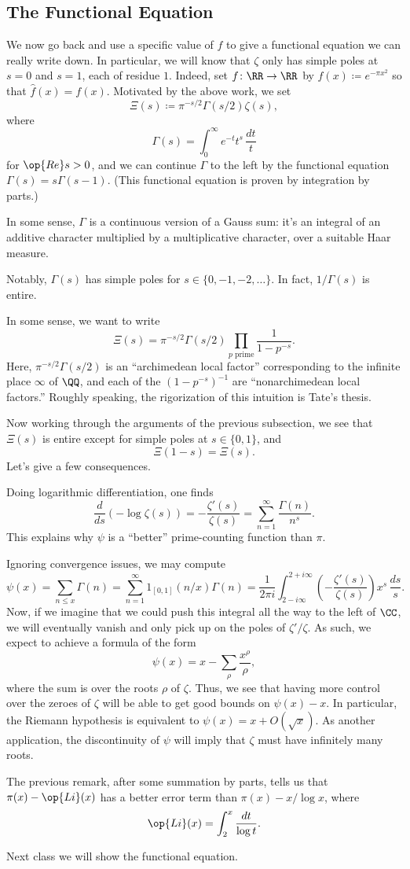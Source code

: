 \documentclass[../notes.tex]{subfiles}
\begin{document}
\subsection{The Functional Equation}
We now go back and use a specific value of $f$ to give a functional equation we can really write down. In particular, we will know that $\zeta$ only has simple poles at $s=0$ and $s=1$, each of residue $1$. Indeed, set $f\colon\RR\to\RR$ by $f(x)\coloneqq e^{-\pi x^2}$ so that $\widehat f(x)=f(x)$. Motivated by the above work, we set
\[\Xi(s)\coloneqq\pi^{-s/2}\Gamma(s/2)\zeta(s),\]
where
\[\Gamma(s)=\int_0^\infty e^{-t}t^s\,\frac{dt}t\]
for $\op{Re}s>0$, and we can continue $\Gamma$ to the left by the functional equation $\Gamma(s)=s\Gamma(s-1)$. (This functional equation is proven by integration by parts.)
\begin{remark}
	In some sense, $\Gamma$ is a continuous version of a Gauss sum: it's an integral of an additive character multiplied by a multiplicative character, over a suitable Haar measure.
\end{remark}
\begin{remark}
	Notably, $\Gamma(s)$ has simple poles for $s\in\{0,-1,-2,\ldots\}$. In fact, $1/\Gamma(s)$ is entire.
\end{remark}
\begin{remark}
	In some sense, we want to write
	\[\Xi(s)=\pi^{-s/2}\Gamma(s/2)\prod_{p\text{ prime}}\frac1{1-p^{-s}}.\]
	Here, $\pi^{-s/2}\Gamma(s/2)$ is an ``archimedean local factor'' corresponding to the infinite place $\infty$ of $\QQ$, and each of the $\left(1-p^{-s}\right)^{-1}$ are ``nonarchimedean local factors.'' Roughly speaking, the rigorization of this intuition is Tate's thesis.
\end{remark}
Now working through the arguments of the previous subsection, we see that $\Xi(s)$ is entire except for simple poles at $s\in\{0,1\}$, and
\[\Xi(1-s)=\Xi(s).\]
Let's give a few consequences.
\begin{remark}
	Doing logarithmic differentiation, one finds
	\[\frac d{ds}(-\log\zeta(s))=-\frac{\zeta'(s)}{\zeta(s)}=\sum_{n=1}^\infty\frac{\Gamma(n)}{n^s}.\]
	This explains why $\psi$ is a ``better'' prime-counting function than $\pi$.
\end{remark}
\begin{remark}
	Ignoring convergence issues, we may compute
	\[\psi(x)=\sum_{n\le x}\Gamma(n)=\sum_{n=1}^\infty1_{[0,1]}(n/x)\Gamma(n)=\frac1{2\pi i}\int_{2-i\infty}^{2+i\infty}\left(-\frac{\zeta'(s)}{\zeta(s)}\right)x^s\,\frac{ds}s.\]
	Now, if we imagine that we could push this integral all the way to the left of $\CC$, we will eventually vanish and only pick up on the poles of $\zeta'/\zeta$. As such, we expect to achieve a formula of the form
	\[\psi(x)=x-\sum_\rho\frac{x^\rho}\rho,\]
	where the sum is over the roots $\rho$ of $\zeta$. Thus, we see that having more control over the zeroes of $\zeta$ will be able to get good bounds on $\psi(x)-x$. In particular, the Riemann hypothesis is equivalent to $\psi(x)=x+O(\sqrt x)$. As another application, the discontinuity of $\psi$ will imply that $\zeta$ must have infinitely many roots.
\end{remark}
\begin{remark}
	The previous remark, after some summation by parts, tells us that $\pi(x)-\op{Li}(x)$ has a better error term than $\pi(x)-x/\log x$, where
	\[\op{Li}(x)=\int_2^x\frac{dt}{\log t}.\]
\end{remark}
Next class we will show the functional equation.
\end{document}
